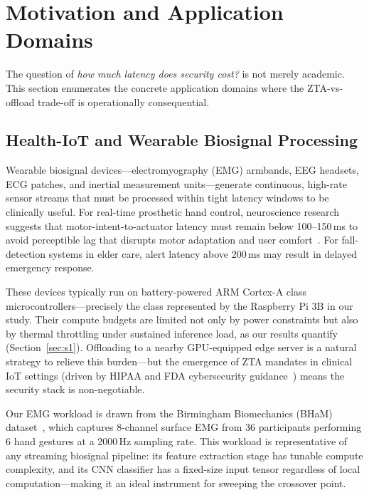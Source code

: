 \documentclass[10pt,twocolumn]{article}
\begin{document}
\section{Motivation and Application Domains}
\label{sec:motivation}

The question of \emph{how much latency does security cost?} is not merely
academic.  This section enumerates the concrete application domains where
the ZTA-vs-offload trade-off is operationally consequential.

\subsection{Health-IoT and Wearable Biosignal Processing}

Wearable biosignal devices—electromyography (EMG) armbands, EEG headsets,
ECG patches, and inertial measurement units—generate continuous, high-rate
sensor streams that must be processed within tight latency windows to be
clinically useful.  For real-time prosthetic hand control, neuroscience
research suggests that motor-intent-to-actuator latency must remain below
100--150\,ms to avoid perceptible lag that disrupts motor adaptation and
user comfort~\cite{zanghieri2019tcn}.  For fall-detection systems in elder
care, alert latency above 200\,ms may result in delayed emergency response.

These devices typically run on battery-powered ARM Cortex-A class
microcontrollers—precisely the class represented by the Raspberry Pi 3B in
our study.  Their compute budgets are limited not only by power constraints
but also by thermal throttling under sustained inference load, as our results
quantify (Section~\ref{sec:s1}).  Offloading to a nearby GPU-equipped edge
server is a natural strategy to relieve this burden—but the emergence of ZTA
mandates in clinical IoT settings (driven by HIPAA and FDA cybersecurity
guidance~\cite{nist_zt}) means the security stack is non-negotiable.

Our EMG workload is drawn from the Birmingham Biomechanics (BHaM) dataset~\cite{bham_dataset},
which captures 8-channel surface EMG from 36 participants performing 6 hand gestures
at a 2000\,Hz sampling rate.  This workload is representative of any streaming
biosignal pipeline: its feature extraction stage has tunable compute complexity, and
its CNN classifier has a fixed-size input tensor regardless of local computation—making
it an ideal instrument for sweeping the crossover point.
\end{document}
